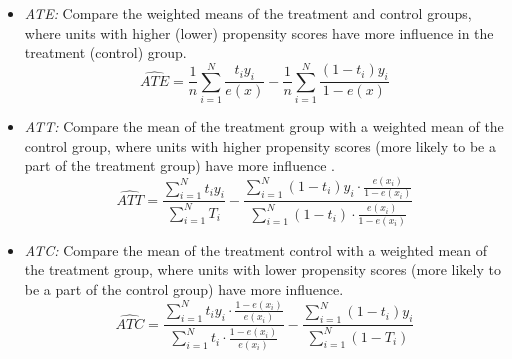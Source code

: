 \documentclass[11pt]{article}
\newcommand{\gur}[1]{{\color{teal}{Gur: #1}}}
\begin{document}
\begin{itemize}
    \item \textit{ATE:} Compare the weighted means of the treatment and control groups, where units with higher (lower) propensity scores have more influence in the treatment (control) group.
    \[
    \widehat{ATE} = \frac{1}{n}\sum_{i=1}^N \frac{t_i y_i}{e(x)} - \frac{1}{n}\sum_{i=1}^N \frac{(1-t_i)y_i}{1-e(x)}
    \]

    \item \textit{ATT:} Compare the mean of the treatment group with a weighted mean of the control group, where units with higher propensity scores (more likely to be a part of the treatment group) have more influence \citep{lechner2001identification}.
    \[
    \widehat{ATT} = \frac{\sum_{i=1}^N t_i y_i}{\sum_{i=1}^N T_i} - \frac{\sum_{i=1}^N (1-t_i)y_i \cdot \frac{e(x_i)}{1-e(x_i)}}{\sum_{i=1}^N (1-t_i) \cdot \frac{e(x_i)}{1-e(x_i)}}
    \]
    \item \textit{ATC:} Compare the mean of the treatment control with a weighted mean of the treatment group, where units with lower propensity scores (more likely to be a part of the control group) have more influence.
    \[
    \widehat{ATC} = \frac{\sum_{i=1}^N t_iy_i \cdot \frac{1-e(x_i)}{e(x_i)}}{\sum_{i=1}^N t_i \cdot \frac{1-e(x_i)}{e(x_i)}} - \frac{\sum_{i=1}^N (1-t_i)y_i}{\sum_{i=1}^N (1-T_i)}
    \]
\end{itemize}



\end{document}
